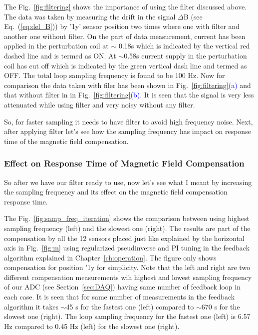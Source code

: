 The Fig.~\ref{fig:filtering} shows the importance of using the filter discussed above. The data was taken by measuring the drift in the signal $\Delta$B (see Eq.~(\ref{eq:del_B})) by '1y' sensor position two times where one with filter and another one without filter. On the part of data measurement, current has been applied in the perturbation coil at $\sim$ 0.18s which is indicated by the vertical red dashed line and is termed as ON. At $\sim$0.58s current supply in the perturbation coil has cut off which is indicated by the green vertical dash line and termed as OFF. The total loop sampling frequency is found to be 100 Hz. Now for comparison the data taken with filer has been shown in Fig.~\ref{fig:filtering}\textcolor{blue}{(a)} and that without filter in in Fig.~\ref{fig:filtering}\textcolor{blue}{(b)}. It is seen that the signal is very less attenuated while using filter and very noisy without any filter.

So, for faster sampling it needs to have filter to avoid high frequency noise. Next, after applying filter let's see how the sampling frequency has impact on response time of the magnetic field compensation.

\FloatBarrier
\subsubsection{Effect on Response Time of Magnetic Field Compensation}
So after we have our filter ready to use, now let's see what I meant by increasing the sampling frequency and its effect on the magnetic field  compensation response time.


The Fig.~\ref{fig:samp_freq_iteration} shows the comparison between using highest sampling frequency (left) and the slowest one (right). The results are part of the compensation by all the 12 sensors placed just like explained by the horizontal axis in Fig.~\ref{fig:m} using regularized pseudinverse and PI tuning in the feedback algorithm explained in Chapter~\ref{ch:operation}. The figure only shows compensation for position '1y for simplicity. Note that the left and right are two different compensation measurements wih highest and lowest sampling frequency of our ADC (see Section~\ref{sec:DAQ}) having same number of feedback loop in each case. It is seen that for same number of measurements in the feedback algorithm it takes $\sim$45 s for the fastest one (left) compared to $\sim$670 s for the slowest one (right). The loop sampling  frequency for the fastest one (left) is 6.57 Hz compared to 0.45 Hz (left) for the slowest one (right). 


